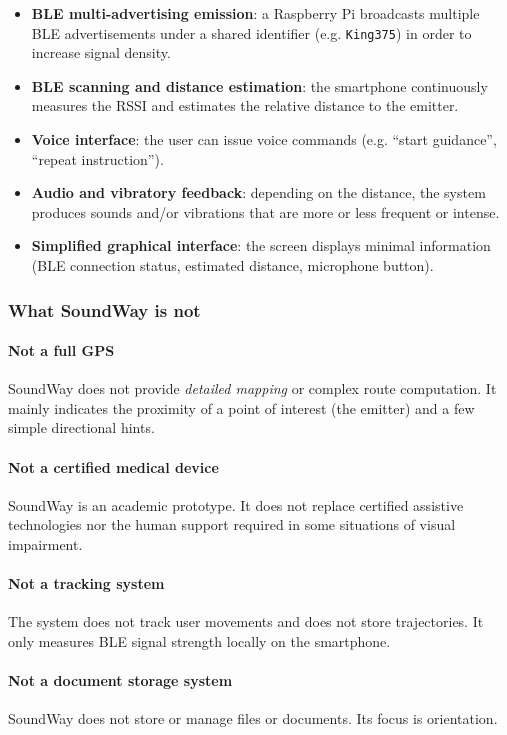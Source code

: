 \documentclass[12pt,a4paper]{article}
\begin{document}
\begin{itemize}
    \item \textbf{BLE multi-advertising emission}:  
    a Raspberry Pi broadcasts multiple BLE advertisements under a shared identifier (e.g. \texttt{King375}) in order to increase signal density.
    \item \textbf{BLE scanning and distance estimation}:  
    the smartphone continuously measures the RSSI and estimates the relative distance to the emitter.
    \item \textbf{Voice interface}:  
    the user can issue voice commands (e.g. “start guidance”, “repeat instruction”).
    \item \textbf{Audio and vibratory feedback}:  
    depending on the distance, the system produces sounds and/or vibrations that are more or less frequent or intense.
    \item \textbf{Simplified graphical interface}:  
    the screen displays minimal information (BLE connection status, estimated distance, microphone button).
\end{itemize}

\subsubsection{What SoundWay is not}

\paragraph{Not a full GPS}
SoundWay does not provide \textit{detailed mapping} or complex route computation. It mainly indicates the proximity of a point of interest (the emitter) and a few simple directional hints.

\paragraph{Not a certified medical device}
SoundWay is an academic prototype. It does not replace certified assistive technologies nor the human support required in some situations of visual impairment.

\paragraph{Not a tracking system}
The system does not track user movements and does not store trajectories. It only measures BLE signal strength locally on the smartphone.

\paragraph{Not a document storage system}
SoundWay does not store or manage files or documents. Its focus is orientation.
\end{document}
